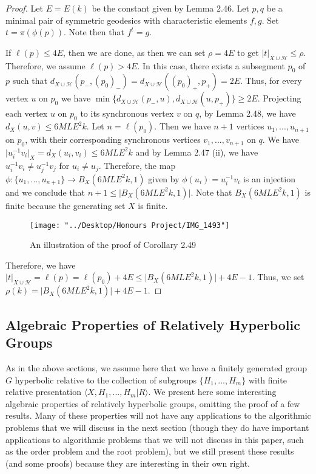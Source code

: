 \documentclass[12pt]{article}
\newcommand{\vs}{\vskip10pt}
\begin{document}
	\begin{proof}
		
		Let $E = E(k)$ be the constant given by Lemma 2.46. Let $p,q$ be a minimal pair of symmetric geodesics with characteristic elements $f,g$. Set $t = \pi(\phi(p))$. Note then that $f^t = g$. 
		
		\vs 
		
		If $\ell(p) \leq 4E$, then we are done, as then we can set $\rho = 4E$ to get $\vert t \vert_{X \cup \mathcal{H}} \leq \rho$. Therefore, we assume $\ell(p) > 4E$. In this case, there exists a subsegment $p_0$ of $p$ such that $d_{X \cup \mathcal{H}}(p_{-}, (p_0)_{-}) = d_{X \cup \mathcal{H}}((p_0)_{+}, p_{+}) = 2E$. Thus, for every vertex $u$ on $p_0$ we have $\min\{d_{X \cup \mathcal{H}}(p_{-}, u), d_{X \cup \mathcal{H}}(u, p_{+})\} \geq 2E$. Projecting each vertex $u$ on $p_0$ to its synchronous vertex $v$ on $q$, by Lemma 2.48, we have $d_X(u,v) \leq 6ML E^2 k$. Let $n = \ell(p_0)$. Then we have $n+1$ vertices $u_1,...,u_{n+1}$ on $p_0$, with their corresponding synchronous vertices $v_1,...,v_{n+1}$ on $q$. We have $\vert u_i^{-1} v_i \vert_X = d_X (u_i,v_i) \leq 6ML E^2 k$ and by Lemma 2.47 (ii), we have $u_i^{-1} v_i \neq u_j^{-1} v_j$ for $u_i \neq u_j$. Therefore, the map $\phi: \{u_1,...,u_{n+1}\} \rightarrow B_X(6MLE^2 k, 1)$ given by $\phi(u_i) = u_i^{-1} v_i$ is an injection and we conclude that $n + 1 \leq \vert B_X(6MLE^2 k, 1) \vert$. Note that $B_X(6MLE^2 k, 1)$ is finite because the generating set $X$ is finite. 
		
\begin{figure} [H]
	\centering
	\texttt{[image: "../Desktop/Honours Project/IMG\_1493"]}
	\caption{An illustration of the proof of Corollary 2.49}
	\label{fig:img1493}
\end{figure}
		
		\vs 
		
		Therefore, we have $\vert t \vert_{X \cup \mathcal{H}} = \ell(p) = \ell(p_0) + 4E \leq \vert B_X(6MLE^2 k, 1) \vert + 4E - 1$. Thus, we set $\rho(k) = \vert B_X(6MLE^2 k, 1) \vert + 4E - 1$. 
		
	\end{proof}
	
	\subsection{Algebraic Properties of Relatively Hyperbolic Groups}
	
	As in the above sections, we assume here that we have a finitely generated group $G$ hyperbolic relative to the collection of subgroups $\{H_1,...,H_m\}$ with finite relative presentation $\langle X, H_1,...,H_m \vert R \rangle$. We present here some interesting algebraic properties of relatively hyperbolic groups, omitting the proof of a few results. Many of these properties will not have any applications to the algorithmic problems that we will discuss in the next section (though they do have important applications to algorithmic problems that we will not discuss in this paper, such as the order problem and the root problem), but we still present these results (and some proofs) because they are interesting in their own right. 
	
\end{document}
